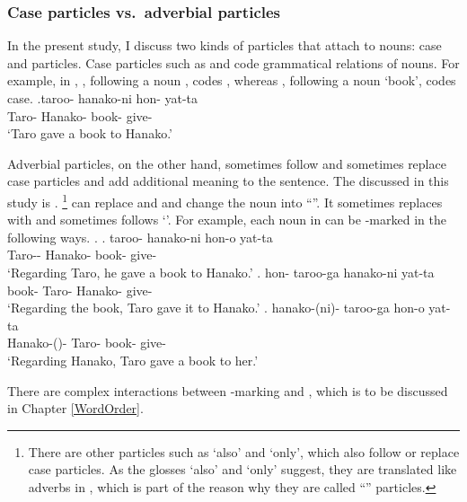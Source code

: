 \subsubsection{Case particles vs.~adverbial particles}

In the present study,
I discuss two kinds of particles that attach to nouns:
case and  particles.
Case particles such as  and 
code grammatical relations of nouns.
For example, in \Next,
, following a noun , codes ,
whereas , following a noun  `book', codes  case.
%
\exg.\label{ExShibatani90257}taroo- hanako-ni hon- yat-ta \\
        Taro- Hanako- book- give- \\
        `Taro gave a book to Hanako.'
  \hfill{\cite[257]{shibatani90}}


Adverbial particles, on the other hand,
sometimes follow and sometimes replace case particles
and add additional meaning to the sentence.
The  discussed in this study is .%
 \footnote{
 There are other  particles such as  `also' and  `only',
 which also follow or replace case particles.
 As the glosses `also' and `only' suggest,
 they are translated like adverbs in ,
 which is part of the reason why they are called ``'' particles.
 }
 can replace  and  and change the noun into ``''.
It sometimes replaces with and sometimes follows  `'.
For example,
each noun in \Last can be -marked in the following ways.
%
\ex. \ag. taroo- hanako-ni hon-o yat-ta \\
        Taro-- Hanako- book- give- \\
        `Regarding Taro, he gave a book to Hanako.'
 \bg. hon- taroo-{ga} hanako-ni yat-ta \\
      book- Taro- Hanako- give- \\
        `Regarding the book, Taro gave it to Hanako.'
 \bg. hanako-(ni)- taroo-{ga} hon-o yat-ta \\
      Hanako-()- Taro- book- give- \\
        `Regarding Hanako, Taro gave a book to her.'

There are complex interactions between -marking and  \cite[e.g.,][]{kuroda79},
which is to be discussed in Chapter \ref{WordOrder}.


